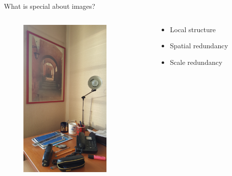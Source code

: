 \documentclass[xcolor=pdftex,dvipsnames,table,mathserif]{beamer}
\begin{document}
\begin{frame}{What is special about images?}

  \begin{columns}
    \begin{column}{.5\textwidth}
      \begin{figure}[ht]
        \centering
        \includegraphics[height=8cm]{bureau-1}
      \end{figure}

    \end{column}
    \begin{column}{.5\textwidth}
      \begin{itemize}
      \item Local structure
      \item Spatial redundancy
      \item Scale redundancy \cite{glasner_super-resolution_2009}
      \end{itemize}
    \end{column}

  \end{columns}

\end{frame}
\end{document}
